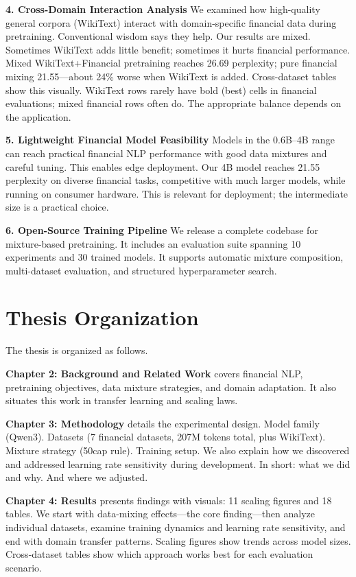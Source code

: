 \textbf{4. Cross-Domain Interaction Analysis}
We examined how high-quality general corpora (WikiText) interact with domain-specific financial data during pretraining. Conventional wisdom says they help. Our results are mixed. Sometimes WikiText adds little benefit; sometimes it hurts financial performance. Mixed WikiText+Financial pretraining reaches 26.69 perplexity; pure financial mixing 21.55—about 24\% worse when WikiText is added. Cross-dataset tables show this visually. WikiText rows rarely have bold (best) cells in financial evaluations; mixed financial rows often do. The appropriate balance depends on the application.

\textbf{5. Lightweight Financial Model Feasibility}
Models in the 0.6B--4B range can reach practical financial NLP performance with good data mixtures and careful tuning. This enables edge deployment. Our 4B model reaches 21.55 perplexity on diverse financial tasks, competitive with much larger models, while running on consumer hardware. This is relevant for deployment; the intermediate size is a practical choice.

\textbf{6. Open-Source Training Pipeline}
We release a complete codebase for mixture-based pretraining. It includes an evaluation suite spanning 10 experiments and 30 trained models. It supports automatic mixture composition, multi-dataset evaluation, and structured hyperparameter search.

\section{Thesis Organization}

The thesis is organized as follows.

\textbf{Chapter 2: Background and Related Work} covers financial NLP, pretraining objectives, data mixture strategies, and domain adaptation. It also situates this work in transfer learning and scaling laws.

\textbf{Chapter 3: Methodology} details the experimental design. Model family (Qwen3). Datasets (7 financial datasets, 207M tokens total, plus WikiText). Mixture strategy (50cap rule). Training setup. We also explain how we discovered and addressed learning rate sensitivity during development. In short: what we did and why. And where we adjusted.

\textbf{Chapter 4: Results} presents findings with visuals: 11 scaling figures and 18 tables. We start with data-mixing effects—the core finding—then analyze individual datasets, examine training dynamics and learning rate sensitivity, and end with domain transfer patterns. Scaling figures show trends across model sizes. Cross-dataset tables show which approach works best for each evaluation scenario.

